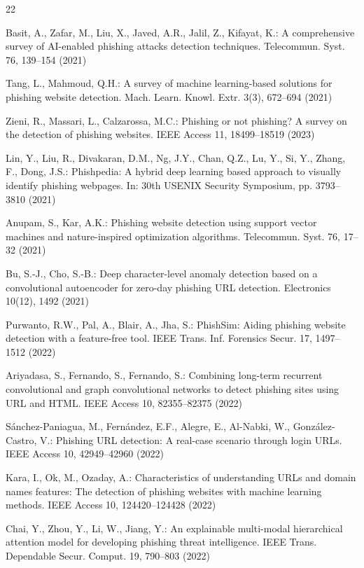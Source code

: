 \documentclass{llncs}
\begin{document}
\begin{thebibliography}{22}

Basit, A., Zafar, M., Liu, X., Javed, A.R., Jalil, Z., Kifayat, K.: A comprehensive survey of AI-enabled phishing attacks detection techniques. Telecommun. Syst. 76, 139--154 (2021)

Tang, L., Mahmoud, Q.H.: A survey of machine learning-based solutions for phishing website detection. Mach. Learn. Knowl. Extr. 3(3), 672--694 (2021)

Zieni, R., Massari, L., Calzarossa, M.C.: Phishing or not phishing? A survey on the detection of phishing websites. IEEE Access 11, 18499--18519 (2023)

Lin, Y., Liu, R., Divakaran, D.M., Ng, J.Y., Chan, Q.Z., Lu, Y., Si, Y., Zhang, F., Dong, J.S.: Phishpedia: A hybrid deep learning based approach to visually identify phishing webpages. In: 30th USENIX Security Symposium, pp. 3793--3810 (2021)

Anupam, S., Kar, A.K.: Phishing website detection using support vector machines and nature-inspired optimization algorithms. Telecommun. Syst. 76, 17--32 (2021)

Bu, S.-J., Cho, S.-B.: Deep character-level anomaly detection based on a convolutional autoencoder for zero-day phishing URL detection. Electronics 10(12), 1492 (2021)

Purwanto, R.W., Pal, A., Blair, A., Jha, S.: PhishSim: Aiding phishing website detection with a feature-free tool. IEEE Trans. Inf. Forensics Secur. 17, 1497--1512 (2022)

Ariyadasa, S., Fernando, S., Fernando, S.: Combining long-term recurrent convolutional and graph convolutional networks to detect phishing sites using URL and HTML. IEEE Access 10, 82355--82375 (2022)

S{\'a}nchez-Paniagua, M., Fern{\'a}ndez, E.F., Alegre, E., Al-Nabki, W., Gonz{\'a}lez-Castro, V.: Phishing URL detection: A real-case scenario through login URLs. IEEE Access 10, 42949--42960 (2022)

Kara, I., Ok, M., Ozaday, A.: Characteristics of understanding URLs and domain names features: The detection of phishing websites with machine learning methods. IEEE Access 10, 124420--124428 (2022)

Chai, Y., Zhou, Y., Li, W., Jiang, Y.: An explainable multi-modal hierarchical attention model for developing phishing threat intelligence. IEEE Trans. Dependable Secur. Comput. 19, 790--803 (2022)


\end{thebibliography}
\end{document}
